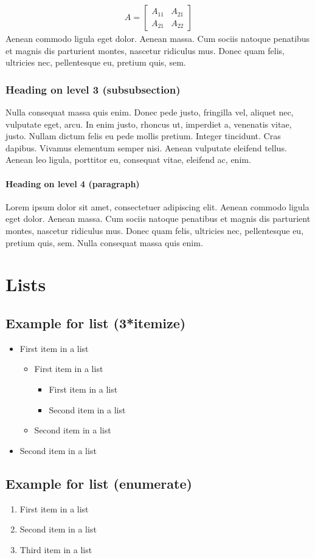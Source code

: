 \documentclass[paper=a4, fontsize=11pt]{scrartcl}
\numberwithin{equation}{section}                %
\numberwithin{figure}{section}                  %
\numberwithin{table}{section}                           %
\begin{document}
\begin{align}
  A = 
  \begin{bmatrix}
  A_{11} & A_{21} \\
    A_{21} & A_{22}
  \end{bmatrix}
\end{align}
Aenean commodo ligula eget dolor. Aenean massa. Cum sociis natoque penatibus et magnis dis parturient montes, nascetur ridiculus mus. Donec quam felis, ultricies nec, pellentesque eu, pretium quis, sem.

\subsubsection{Heading on level 3 (subsubsection)}
Nulla consequat massa quis enim. Donec pede justo, fringilla vel, aliquet nec, vulputate eget, arcu. In enim justo, rhoncus ut, imperdiet a, venenatis vitae, justo. Nullam dictum felis eu pede mollis pretium. Integer tincidunt. Cras dapibus. Vivamus elementum semper nisi. Aenean vulputate eleifend tellus. Aenean leo ligula, porttitor eu, consequat vitae, eleifend ac, enim.

\paragraph{Heading on level 4 (paragraph)}
Lorem ipsum dolor sit amet, consectetuer adipiscing elit. Aenean commodo ligula eget dolor. Aenean massa. Cum sociis natoque penatibus et magnis dis parturient montes, nascetur ridiculus mus. Donec quam felis, ultricies nec, pellentesque eu, pretium quis, sem. Nulla consequat massa quis enim. 


\section{Lists}

\subsection{Example for list (3*itemize)}
\begin{itemize}
  \item First item in a list 
    \begin{itemize}
    \item First item in a list 
      \begin{itemize}
      \item First item in a list 
      \item Second item in a list 
      \end{itemize}
    \item Second item in a list 
    \end{itemize}
  \item Second item in a list 
\end{itemize}

\subsection{Example for list (enumerate)}
\begin{enumerate}
  \item First item in a list 
  \item Second item in a list 
  \item Third item in a list
\end{enumerate}
\cite{Slutz2010}
 
  
\end{document}
